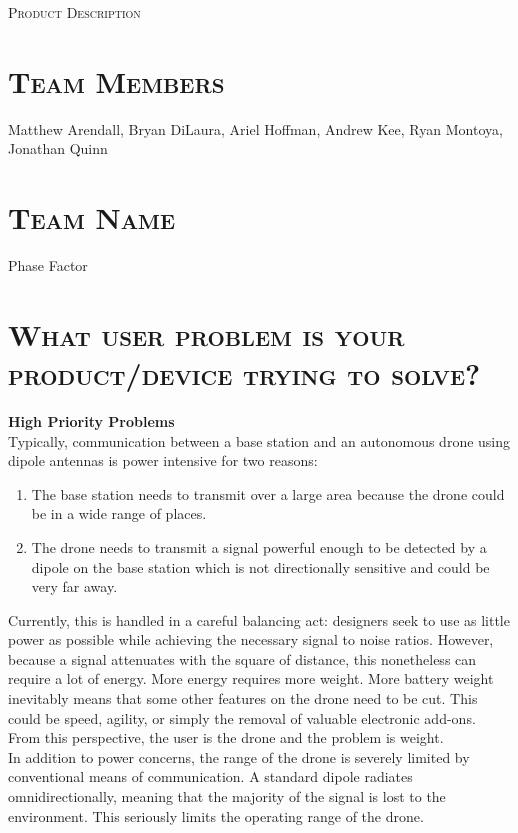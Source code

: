\documentclass[11pt]{article}
\numberwithin{figure}{section}
\begin{document}
\begin{center}
	\textsc{\Large Product Description}\\
	\hrulefill 
\end{center}

\section{\textsc{Team Members}}
	Matthew Arendall, Bryan DiLaura, Ariel Hoffman, Andrew Kee, Ryan Montoya, Jonathan Quinn
	
\section{\textsc{Team Name}}
	Phase Factor
	
\section{\textsc{What user problem is your product/device trying to solve?}}
	\textbf{High Priority Problems}  \\
	Typically, communication between a base station and an autonomous drone using dipole antennas is power intensive for two reasons: 
	\begin{enumerate}
		\item The base station needs to transmit over a large area because the drone could be in a wide range of places.
		\item The drone needs to transmit a signal powerful enough to be detected by a dipole on the base station which is not directionally sensitive and could be very far away.
	\end{enumerate}
	Currently, this is handled in a careful balancing act: designers seek to use as little power as possible while achieving the necessary signal to noise ratios.  However, because a signal attenuates with the square of distance, this nonetheless can require a lot of energy.  More energy requires more weight.  More battery weight inevitably means that some other features on the drone need to be cut.  This could be speed, agility, or simply the removal of valuable electronic add-ons.  From this perspective, the user is the drone and the problem is weight.  \\
	
	In addition to power concerns, the range of the drone is severely limited by conventional means of communication.  A standard dipole radiates omnidirectionally, meaning that the majority of the signal is lost to the environment.  This seriously limits the operating range of the drone.  \\
	
\end{document}
